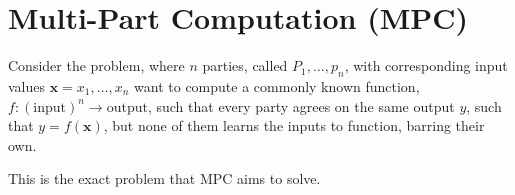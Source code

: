 \section{Multi-Part Computation (MPC)}
\label{sec:background:mpc}
Consider the problem, where $n$ parties, called $P_{1}, \dots, p_{n}$, with
corresponding input values $\textbf{x} = x_{1}, \dots, x_{n}$ want to compute a commonly
known function, $f : (\text{input})^{n} \rightarrow \text{output}$, such that
every party agrees on the same output $y$, such that $y = f(\textbf{x})$, but none of them learns the inputs to function, barring their own.


This is the exact problem that MPC aims to solve.

\begin{definition}[Correctness]
\label{def:mpc:correctness}

\end{definition}

\begin{definition}[d-Privacy]
\label{def:mpc:d-privacy}

\end{definition}

